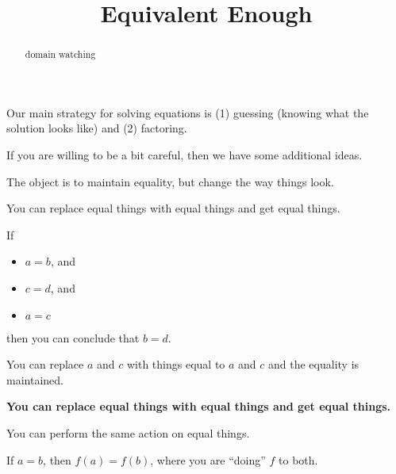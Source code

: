 \documentclass{ximera}
\title{Equivalent Enough}
\begin{document}
\begin{abstract}
domain watching
\end{abstract}
\maketitle





Our main strategy for solving equations is (1) guessing (knowing what the solution looks like) and (2) factoring.




If you are willing to be a bit careful, then we have some additional ideas.

The object is to maintain equality, but change the way things look.



\begin{observation}


You can replace equal things with equal things and get equal things.


If 
\begin{itemize}
\item $a=b$, and
\item $c=d$, and
\item $a=c$
\end{itemize}
then you can conclude that $b=d$.

You can replace $a$ and $c$ with things equal to $a$ and $c$ and the equality is maintained.


\end{observation}



\begin{center}

\textbf{\textcolor{purple!85!blue}{You can replace equal things with equal things and get equal things.}}

\end{center}



\begin{observation}


You can perform the same action on equal things.


If $a=b$, then $f(a) = f(b)$, where you are ``doing'' $f$ to both.



\end{observation}
\end{document}

